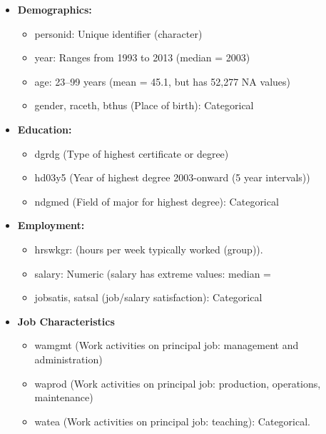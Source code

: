 \documentclass[12pt]{article}
\begin{document}
\begin{itemize}
    \item \textbf{Demographics:} 
        \begin{itemize}
            \item personid: Unique identifier (character)
            \item year: Ranges from 1993 to 2013 (median = 2003)
            \item  age: 23–99 years (mean = 45.1, but has 52,277 NA values)
            \item gender, raceth, bthus (Place of birth): Categorical

        \end{itemize}
            
    \item \textbf{Education: }  
        \begin{itemize}
            \item dgrdg (Type of highest certificate or degree)
            \item hd03y5 (Year of highest degree 2003-onward (5 year intervals))
            \item ndgmed (Field of major for highest degree): Categorical
        \end{itemize}

           \item \textbf{Employment:} 
                \begin{itemize}
                    \item hrswkgr: (hours per week typically worked (group)).
                    \item salary: Numeric (salary has extreme values: median = %
                    \item jobsatis, satsal (job/salary satisfaction): Categorical
                \end{itemize}
                
            \item \textbf{Job Characteristics}
                \begin{itemize}
                    \item wamgmt (Work activities on principal job: management and administration)
                    \item waprod (Work activities on principal job: production, operations, maintenance)
                    \item watea (Work activities on principal job: teaching): Categorical. 
                \end{itemize}
                

\end{itemize}
\end{document}
